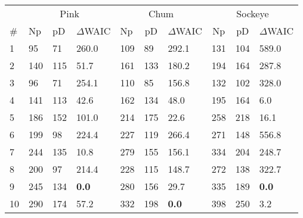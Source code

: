\begin{tabular}{llllllllll}
  \hline
  \multicolumn{1}{r}{} &
            \multicolumn{3}{c}{Pink} &
            \multicolumn{3}{c}{Chum} &
            \multicolumn{3}{c}{Sockeye} \\ 
  \cmidrule(lr){2-4} \cmidrule(lr){5-7} \cmidrule(lr){8-10} 
  \multicolumn{1}{l}{\#} & 
    \multicolumn{1}{l}{Np} & 
    \multicolumn{1}{l}{pD} & 
    \multicolumn{1}{l}{$\Delta$WAIC} & 
    \multicolumn{1}{l}{Np} & 
    \multicolumn{1}{c}{pD} & 
    \multicolumn{1}{c}{$\Delta$WAIC} & 
    \multicolumn{1}{c}{Np} & 
    \multicolumn{1}{c}{pD} & 
    \multicolumn{1}{l}{$\Delta$WAIC} \\ 
  \cmidrule{1-10} 
1 & 95 & 71 & 260.0 & 109 & 89 & 292.1 & 131 & 104 & 589.0 \\ 
  2 & 140 & 115 & 51.7 & 161 & 133 & 180.2 & 194 & 164 & 287.8 \\ 
  3 & 96 & 71 & 254.1 & 110 & 85 & 156.8 & 132 & 102 & 328.0 \\ 
  4 & 141 & 113 & 42.6 & 162 & 134 & 48.0 & 195 & 164 & 6.0 \\ 
  5 & 186 & 152 & 101.0 & 214 & 175 & 22.6 & 258 & 218 & 16.1 \\ 
  6 & 199 & 98 & 224.4 & 227 & 119 & 266.4 & 271 & 148 & 556.8 \\ 
  7 & 244 & 135 & 10.8 & 279 & 155 & 156.1 & 334 & 204 & 248.7 \\ 
  8 & 200 & 97 & 214.4 & 228 & 115 & 148.7 & 272 & 138 & 322.7 \\ 
  9 & 245 & 134 & \textbf{0.0} & 280 & 156 & 29.7 & 335 & 189 & \textbf{0.0} \\ 
  10 & 290 & 174 & 57.2 & 332 & 198 & \textbf{0.0} & 398 & 250 & 3.2 \\ 
   \hline
\end{tabular}
